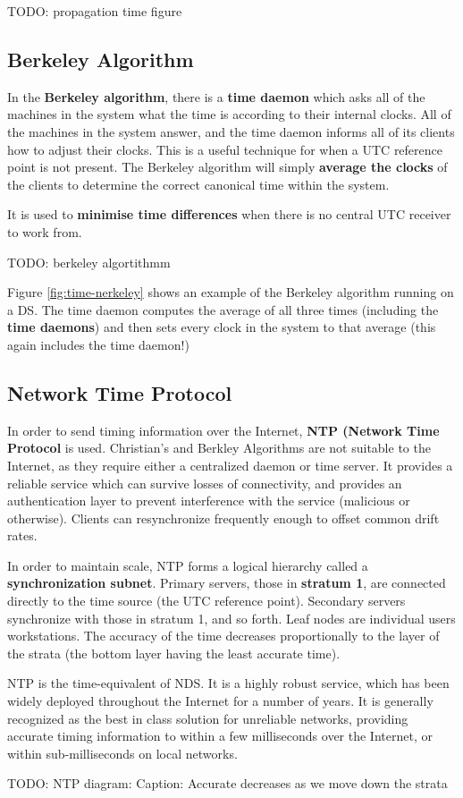 \documentclass{article}
\begin{document}
TODO: propagation time figure

\subsection{Berkeley Algorithm}

In the \textbf{Berkeley algorithm}, there is a \textbf{time daemon} which asks all of the machines in the system what the time is according to their internal clocks. All of the machines in the system answer, and the time daemon informs all of its clients how to adjust their clocks. This is a useful technique for when a UTC reference point is not present. The Berkeley algorithm will simply \textbf{average the clocks} of the clients to determine the correct canonical time within the system.

It is used to \textbf{minimise time differences} when there is no central UTC receiver to work from.

TODO: berkeley algortithmm

Figure \ref{fig:time-nerkeley} shows an example of the Berkeley algorithm running on a DS. The time daemon computes the average of all three times (including the \textbf{time daemons}) and then sets every clock in the system to that average (this again includes the time daemon!)

\subsection{Network Time Protocol}

In order to send timing information over the Internet, \textbf{NTP (Network Time Protocol} is used. Christian's and Berkley Algorithms are not suitable to the Internet, as they require either a centralized daemon or time server. It provides a reliable service which can survive losses of connectivity, and provides an authentication layer to prevent interference with the service (malicious or otherwise). Clients can resynchronize frequently enough to offset common drift rates.

In order to maintain scale, NTP forms a logical hierarchy called a \textbf{synchronization subnet}. Primary servers, those in \textbf{stratum 1}, are connected directly to the time source (the UTC reference point). Secondary servers synchronize with those in stratum 1, and so forth. Leaf nodes are individual users workstations. The accuracy of the time decreases proportionally to the layer of the strata (the bottom layer having the least accurate time). 

NTP is the time-equivalent of NDS. It is a highly robust service, which has been widely deployed throughout the Internet for a number of years. It is generally recognized as the best in class solution for unreliable networks, providing accurate timing information to within a few milliseconds over the Internet, or within sub-milliseconds on local networks.

TODO: NTP diagram: Caption: Accurate decreases as we move down the strata
\end{document}
